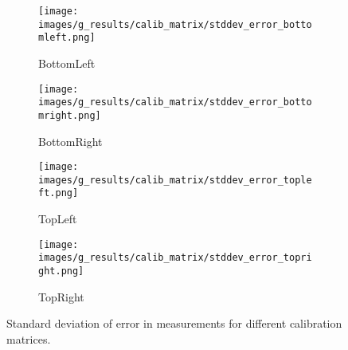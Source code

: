     \begin{figure}[ht]
        \centering
        \begin{subfigure}[b]{0.46\textwidth}
            \centering
            \texttt{[image: images/g\_results/calib\_matrix/stddev\_error\_bottomleft.png]}
            \caption{\textsf{BottomLeft}}
        \end{subfigure}
        \hspace{1cm}
        \begin{subfigure}[b]{0.46\textwidth}
            \centering
            \texttt{[image: images/g\_results/calib\_matrix/stddev\_error\_bottomright.png]}
            \caption{\textsf{BottomRight}}
        \end{subfigure}

        \vspace{5mm}
        
        \begin{subfigure}[b]{0.46\textwidth}
            \centering
            \texttt{[image: images/g\_results/calib\_matrix/stddev\_error\_topleft.png]}
            \caption{\textsf{TopLeft}}
        \end{subfigure}
        \hspace{1cm}
        \begin{subfigure}[b]{0.46\textwidth}
            \centering
            \texttt{[image: images/g\_results/calib\_matrix/stddev\_error\_topright.png]}
            \caption{\textsf{TopRight}}
        \end{subfigure}

        \caption{Standard deviation of error in measurements for different calibration matrices.}
        \label{fig:stddev_error_calib_matrices}
    \end{figure}


    

